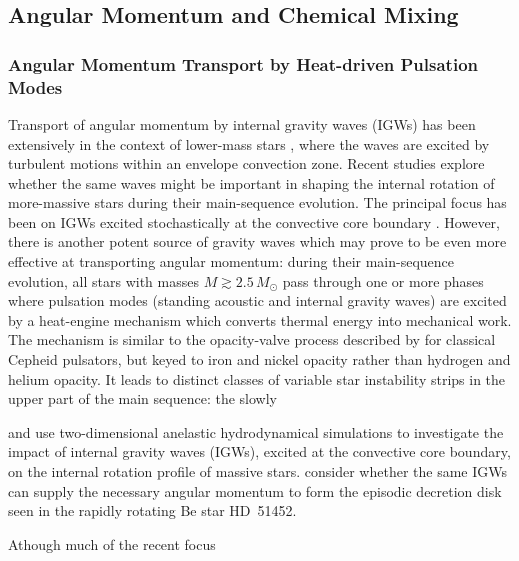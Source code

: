 
\subsection{Angular Momentum and Chemical Mixing}



{\color{brown}
\subsubsection{Angular Momentum Transport by Heat-driven Pulsation Modes}

Transport of angular momentum by internal gravity waves (IGWs) has been extensively in the context of lower-mass stars \citep[e.g.,][]{Schatzman:1993,Kumar:1997,Zahn:1997,Talon:2002,Talon:2005,Rogers:2008}, where the waves are excited by turbulent motions within an envelope convection zone. Recent studies explore whether the same waves might be important in shaping the internal rotation of more-massive stars during their main-sequence evolution. The principal focus has been on IGWs excited stochastically at the convective core boundary \citep[e.g.][]{Rogers:2013,Lee:2014,Rogers:2015}. However, there is another potent source of gravity waves which may prove to be even more effective at transporting angular momentum: during their main-sequence evolution, all stars with masses $M \gtrsim 2.5\,M_{\odot}$ pass through one or more phases where pulsation modes (standing acoustic and internal gravity waves) are excited by a heat-engine mechanism which converts thermal energy into mechanical work. The mechanism is similar to the opacity-valve process described by \citet{Eddington:1926} for classical Cepheid pulsators, but keyed to iron and nickel opacity rather than hydrogen and helium opacity. It leads to distinct classes of variable star instability strips in the upper part of the main sequence: the slowly

\citet{Rogers:2013aa} and
\citet{Rogers:2015aa} use two-dimensional anelastic hydrodynamical
simulations to investigate the impact of internal gravity waves
(IGWs), excited at the convective core boundary, on the internal
rotation profile of massive stars. \citet{Lee:2014aa} consider whether
the same IGWs can supply the necessary angular momentum to form the
episodic decretion disk seen in the rapidly rotating Be star HD~51452.


Athough much of the recent focus 

}
